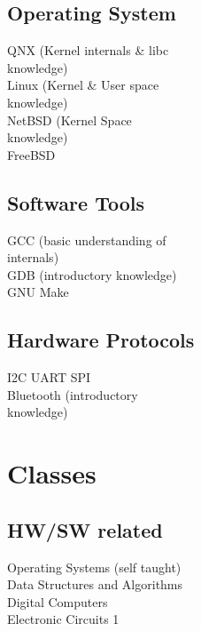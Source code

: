 \documentclass[letterpaper, 10pt]{deedy-resume} %
\begin{document}
{\begin{minipage}[t]{0.30\textwidth}
\sectionspace

\subsection{Operating System}
\textbullet{} QNX (Kernel internals \& libc \\
\hspace{2mm} knowledge) \\
\textbullet{} Linux (Kernel \& User space \\
\hspace{2mm} knowledge) \\
\textbullet{} NetBSD (Kernel Space \\
\hspace{2mm} knowledge) \\
\textbullet{} FreeBSD \\
\sectionspace %
\subsection{Software Tools}
\textbullet{} GCC (basic understanding of \\
\hspace{2mm} internals) \\ 
\textbullet{} GDB (introductory knowledge)\\
\textbullet{} GNU Make \\

\sectionspace %

\subsection{Hardware Protocols}

\textbullet{} I2C \textbullet{} UART \textbullet{} SPI \\
\textbullet{} Bluetooth (introductory \\ 
\hspace{2mm} knowledge) \\
\sectionspace %


\section{Classes}
\subsection{HW/SW related}
\textbullet{} Operating Systems (self taught) \\
\textbullet{} Data Structures and Algorithms \\
\textbullet{} Digital Computers \\
\textbullet{} Electronic Circuits 1\\
\sectionspace %


\end{minipage}}
\end{document}
